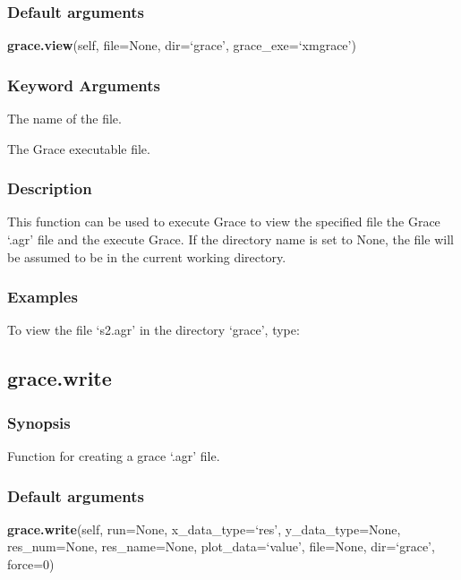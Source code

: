 \subsubsection{Default arguments}

\textsf{\textbf{grace.view}(self, file=None, dir=`grace', grace\_exe=`xmgrace')}


\subsubsection{Keyword Arguments}

  The name of the file.

  The Grace executable file.

\subsubsection{Description}

This function can be used to execute Grace to view the specified file the Grace `.agr' file
and the execute Grace. If the directory name is set to None, the file will be assumed to be
in the current working directory.


\subsubsection{Examples}

To view the file `s2.agr' in the directory `grace', type:




\newpage

\subsection{grace.write}


\subsubsection{Synopsis}

Function for creating a grace `.agr' file.

\subsubsection{Default arguments}

\textsf{\textbf{grace.write}(self, run=None, x\_data\_type=`res', y\_data\_type=None, res\_num=None, res\_name=None, plot\_data=`value', file=None, dir=`grace', force=0)}


